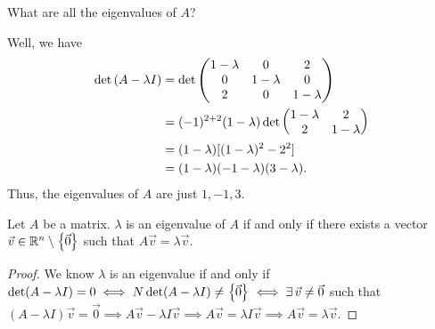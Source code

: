 \documentclass[main.tex]{subfiles}
\begin{document}
\begin{example}
    What are all the eigenvalues of $A$?
\end{example}

Well, we have
\begin{align*}
    \det \left( A - \lambda I \right) &= \det \begin{pmatrix}
        1 - \lambda & 0 & 2 \\
        0 & 1 - \lambda & 0 \\
        2 & 0 & 1 - \lambda
    \end{pmatrix} \\
    &= (-1)^{2 + 2}(1 - \lambda)\det \begin{pmatrix}
        1 - \lambda & 2 \\
        2 & 1 - \lambda
    \end{pmatrix} \\
    &= (1 - \lambda)[(1 - \lambda)^2 - 2^2] \\
    &= (1 - \lambda)(-1 - \lambda)(3 - \lambda).
\end{align*}
Thus, the eigenvalues of $A$ are just $1, -1, 3$.

\begin{lemma}
    Let $A$ be a matrix. $\lambda$ is an eigenvalue of $A$ if and only if there exists a vector $\vec{v} \in \mathbb R^n \setminus\left\{ \vec{0} \right\}$ such that $A\vec{v} = \lambda \vec{v}$.
\end{lemma}

\begin{proof}
    We know $\lambda$ is an eigenvalue if and only if $\det (A - \lambda I) = 0 \iff N\det (A - \lambda I) \neq \left\{ \vec{0} \right\} \iff \exists\,\vec{v} \neq \vec{0}$ such that $(A - \lambda I)\vec{v} = \vec{0}\implies A\vec{v} - \lambda I \vec{v} \implies A\vec{v} = \lambda I \vec{v} \implies A\vec{v} = \lambda\vec{v}$.
\end{proof}
\end{document}
